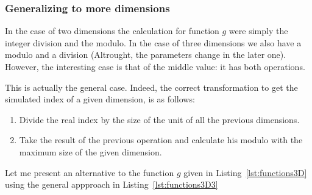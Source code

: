 {\centering
\begin{minipage}{\linewidth}
\end{minipage}
\par
}

\subsubsection{Generalizing to more dimensions}
\label{sec:moreDim}

In the case of two dimensions the calculation for function $g$ were simply the integer division and the modulo. In the case of three dimensions we also have a modulo and a division (Altrought, the parameters change in the later one). However, the interesting case is that of the middle value: it has both operations.

This is actually the general case. Indeed, the correct transformation to get the simulated index of a given dimension, is as follows:
\begin{enumerate}
  \item Divide the real index by the size of the unit of all the previous dimensions.
  \item Take the result of the previous operation and  calculate his modulo with the maximum size of the given dimension.
\end{enumerate}

Let me present an alternative to the function $g$ given in Listing~\ref{lst:functions3D} using the general appproach in Listing~\ref{lst:functions3D3}

{\centering
\begin{minipage}{\linewidth}
\end{minipage}
\par
}
\vspace{0.5cm}

